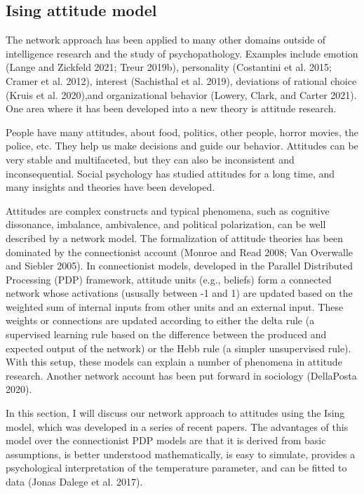 \documentclass[
  a4paper,
  DIV=11,
  numbers=noendperiod,
  oneside]{scrreprt}
\begin{document}
\hypertarget{sec-Ising-attitude-model}{%
\subsection{Ising attitude model}\label{sec-Ising-attitude-model}}

The network approach has been applied to many other domains outside of
intelligence research and the study of psychopathology. Examples include
emotion (Lange and Zickfeld 2021; Treur 2019b), personality (Costantini
et al. 2015; Cramer et al. 2012), interest (Sachisthal et al. 2019),
deviations of rational choice (Kruis et al. 2020),and organizational
behavior (Lowery, Clark, and Carter 2021). One area where it has been
developed into a new theory is attitude research.

People have many attitudes, about food, politics, other people, horror
movies, the police, etc. They help us make decisions and guide our
behavior. Attitudes can be very stable and multifaceted, but they can
also be inconsistent and inconsequential. Social psychology has studied
attitudes for a long time, and many insights and theories have been
developed.

Attitudes are complex constructs and typical phenomena, such as
cognitive dissonance, imbalance, ambivalence, and political
polarization, can be well described by a network model. The
formalization of attitude theories has been dominated by the
connectionist account (Monroe and Read 2008; Van Overwalle and Siebler
2005). In connectionist models, developed in the Parallel Distributed
Processing (PDP) framework, attitude units (e.g., beliefs) form a
connected network whose activations (ususally between -1 and 1) are
updated based on the weighted sum of internal inputs from other units
and an external input. These weights or connections are updated
according to either the delta rule (a supervised learning rule based on
the difference between the produced and expected output of the network)
or the Hebb rule (a simpler unsupervised rule). With this setup, these
models can explain a number of phenomena in attitude research. Another
network account has been put forward in sociology (DellaPosta 2020).

In this section, I will discuss our network approach to attitudes using
the Ising model, which was developed in a series of recent papers. The
advantages of this model over the connectionist PDP models are that it
is derived from basic assumptions, is better understood mathematically,
is easy to simulate, provides a psychological interpretation of the
temperature parameter, and can be fitted to data (Jonas Dalege et al.
2017).
\end{document}
